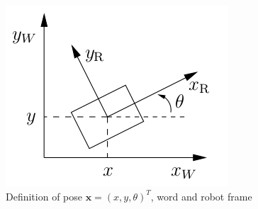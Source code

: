 \documentclass{beamer}
\begin{document}
\begin{frame}
\begin{columns}
  \begin{figure}
    \includegraphics[width = \textwidth]{fig/pose.png}
    \caption{Definition of pose $\textbf{x} = (x, y, \theta)^T$, word and robot frame \cite{Roehrig2017@motion}}
  \end{figure}
  \end{columns}
\end{frame}
\end{document}
